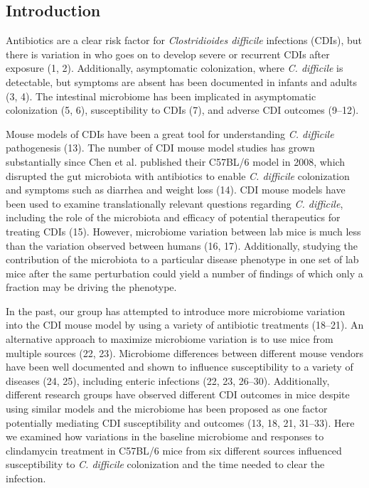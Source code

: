 \documentclass[11pt,]{article}
\begin{document}
\newpage

\subsection{Introduction}\label{introduction}

Antibiotics are a clear risk factor for \emph{Clostridioides difficile}
infections (CDIs), but there is variation in who goes on to develop
severe or recurrent CDIs after exposure (1, 2). Additionally,
asymptomatic colonization, where \emph{C. difficile} is detectable, but
symptoms are absent has been documented in infants and adults (3, 4).
The intestinal microbiome has been implicated in asymptomatic
colonization (5, 6), susceptibility to CDIs (7), and adverse CDI
outcomes (9--12).

Mouse models of CDIs have been a great tool for understanding \emph{C.
difficile} pathogenesis (13). The number of CDI mouse model studies has
grown substantially since Chen et al. published their C57BL/6 model in
2008, which disrupted the gut microbiota with antibiotics to enable
\emph{C. difficile} colonization and symptoms such as diarrhea and
weight loss (14). CDI mouse models have been used to examine
translationally relevant questions regarding \emph{C. difficile},
including the role of the microbiota and efficacy of potential
therapeutics for treating CDIs (15). However, microbiome variation
between lab mice is much less than the variation observed between humans
(16, 17). Additionally, studying the contribution of the microbiota to a
particular disease phenotype in one set of lab mice after the same
perturbation could yield a number of findings of which only a fraction
may be driving the phenotype.

In the past, our group has attempted to introduce more microbiome
variation into the CDI mouse model by using a variety of antibiotic
treatments (18--21). An alternative approach to maximize microbiome
variation is to use mice from multiple sources (22, 23). Microbiome
differences between different mouse vendors have been well documented
and shown to influence susceptibility to a variety of diseases (24, 25),
including enteric infections (22, 23, 26--30). Additionally, different
research groups have observed different CDI outcomes in mice despite
using similar models and the microbiome has been proposed as one factor
potentially mediating CDI susceptibility and outcomes (13, 18, 21,
31--33). Here we examined how variations in the baseline microbiome and
responses to clindamycin treatment in C57BL/6 mice from six different
sources influenced susceptibility to \emph{C. difficile} colonization
and the time needed to clear the infection.
\end{document}
